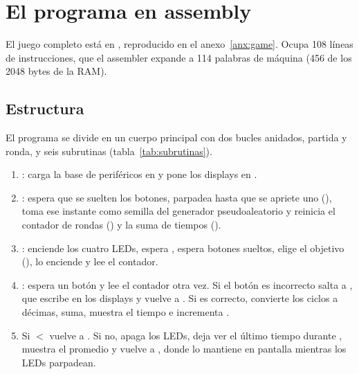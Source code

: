 \section{El programa en assembly}
\label{sec:programa}

El juego completo está en , reproducido en el
anexo~\ref{anx:game}. Ocupa 108 líneas de instrucciones, que el assembler expande a
114 palabras de máquina (456 de los 2048 bytes de la RAM).

\subsection{Estructura}

El programa se divide en un cuerpo principal con dos bucles anidados, partida y ronda,
y seis subrutinas (tabla~\ref{tab:subrutinas}).

\begin{enumerate}
  \item {}: carga la base de periféricos en  y pone los displays
        en .
  \item {}: espera que se suelten los botones, parpadea hasta que se apriete
        uno (), toma ese instante como semilla del generador
        pseudoaleatorio y reinicia el contador de rondas () y la suma de
        tiempos ().
  \item {}: enciende los cuatro LEDs, espera , espera
        botones sueltos, elige el objetivo (), lo enciende y lee el
        contador.
  \item {}: espera un botón y lee el contador otra vez. Si el botón es
        incorrecto salta a , que escribe  en los displays y
        vuelve a . Si es correcto, convierte los ciclos a décimas, suma,
        muestra el tiempo e incrementa .
  \item Si  $<$  vuelve a . Si no, apaga los LEDs,
        deja ver el último tiempo durante , muestra el promedio y
        vuelve a , donde  lo mantiene en pantalla mientras
        los LEDs parpadean.
\end{enumerate}

